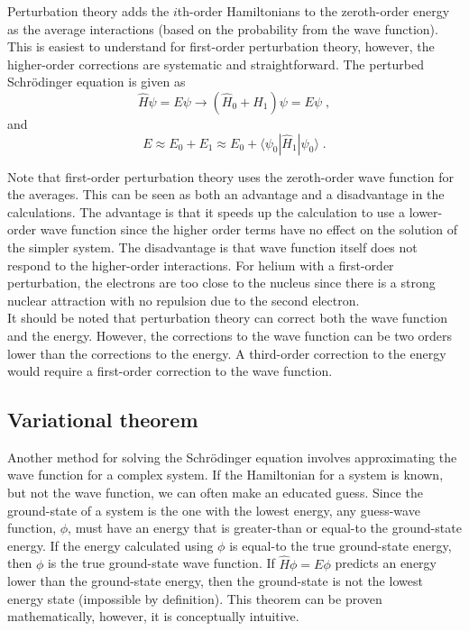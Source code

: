 \documentclass[12pt]{report}
\begin{document}
Perturbation theory adds the $i$th-order Hamiltonians to the zeroth-order
energy as the average interactions (based on the probability from the
wave function).
This is easiest to understand for first-order perturbation theory, however,
the higher-order corrections are systematic and straightforward.
The perturbed Schr\"{o}dinger equation is given as
\begin{equation}
 \hat H\psi=E\psi \to (\hat H_0 + \hat H_1)\psi = E\psi \; ,
\end{equation}
and
\begin{equation}
 E \approx E_0 + E_1 \approx E_0 + \langle\psi_0|\hat H_1|\psi_0\rangle \; .
\end{equation}

Note that first-order perturbation theory uses the zeroth-order wave
function for the averages.
This can be seen as both an advantage and a disadvantage in the calculations.
The advantage is that it speeds up the calculation to use a lower-order wave
function since the higher order terms have no effect on the solution of the
simpler system.
The disadvantage is that wave function itself does not respond
to the higher-order interactions.
For helium with a first-order perturbation, the electrons are too close to the
nucleus since there is a strong nuclear attraction with no repulsion due to
the second electron. \\

It should be noted that perturbation theory can correct both the wave function
and the energy.
However, the corrections to the wave function can be two orders lower than the
corrections to the energy.
A third-order correction to the energy would require a first-order correction
to the wave function.

\subsection{Variational theorem}

Another method for solving the Schr\"{o}dinger equation involves approximating
the wave function for a complex system.
If the Hamiltonian for a system is known, but not the wave function, we can
often make an educated guess.
Since the ground-state of a system is the one with the lowest energy, any
guess-wave function, $\phi$, must have an energy that is greater-than or
equal-to the ground-state energy.
If the energy calculated using $\phi$ is equal-to the true ground-state
energy, then $\phi$ is the true ground-state wave function.
If $\hat H\phi=E\phi$ predicts an energy lower than the ground-state energy,
then the ground-state is not the lowest energy state (impossible by
definition).
This theorem can be proven mathematically, however, it is conceptually
intuitive. \\
\end{document}
